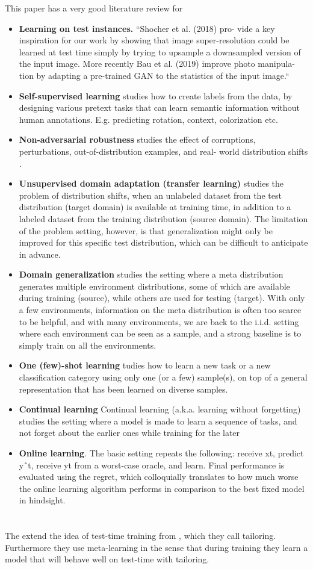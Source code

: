 \documentclass{article}
\newcommand{\citeall}[1]{\citeauthor{#1}}
\newcommand{\uls}{\begin{itemize}}
\newcommand{\ule}{\end{itemize}}
\newcommand{\li}{\item}
\begin{document}
This paper has a very good literature review for 
\uls
\li \textbf{Learning on test instances. }
``Shocher et al. (2018) pro- vide a key inspiration for our work by showing that image super-resolution could be learned at test time simply by trying to upsample a downsampled version of the input image. More recently Bau et al. (2019) improve photo manipula- tion by adapting a pre-trained GAN to the statistics of the input image.``
\li \textbf{Self-supervised learning} studies how to create labels from the data, by designing various pretext tasks that can learn semantic information without human annotations. E.g. predicting rotation, context, colorization etc.
\li \textbf{Non-adversarial robustness} studies the effect of corruptions, perturbations, out-of-distribution examples, and real- world distribution shifts \cite{Hendrycks2019BenchmarkingPerturbations}.

\li \textbf{Unsupervised domain adaptation (transfer learning)} studies the problem of distribution shifts, when an unlabeled dataset from the test distribution (target domain) is available at training time, in addition to a labeled dataset from the training distribution (source domain). The limitation of the problem setting, however, is that generalization might only be improved for this specific test distribution, which can be difficult to anticipate in advance.

\li\textbf{ Domain generalization} studies the setting where a meta distribution generates multiple environment distributions, some of which are available during training (source), while others are used for testing (target). With only a few environments, information on the meta distribution is often too scarce to be helpful, and with many environments, we are back to the i.i.d. setting where each environment can be seen as a sample, and a strong baseline is to simply train on all the environments.

\li \textbf{One (few)-shot learning} tudies how to learn a new task or a new classification category using only one (or a few) sample(s), on top of a general representation that has been learned on diverse samples.
\li \textbf{Continual learning} Continual learning (a.k.a. learning without forgetting) studies the setting where a model is made to learn a sequence of tasks, and not forget about the earlier ones while training for the later
\li \textbf{Online learning}. The basic setting repeats the following: receive xt, predict yˆt, receive yt from a worst-case oracle, and learn. Final performance is evaluated using the regret, which colloquially translates to how much worse the online learning algorithm performs in comparison to the best fixed model in hindsight.
\ule 

\section{\citeall{Alet2020Tailoring:Time}}

The extend the idea of test-time training from \cite{Sun2019Test-TimeShifts}, which they call tailoring. Furthermore they use meta-learning in the sense that during training they learn a model that will behave well on test-time with tailoring.


\printbibliography
\end{document}
